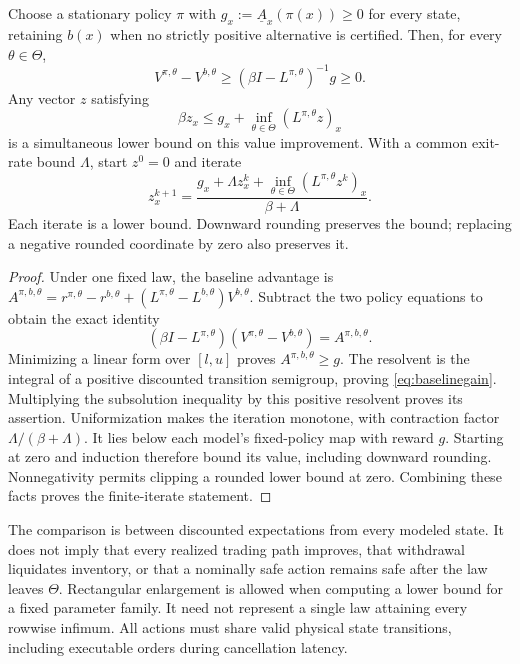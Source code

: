 \begin{theorem}
\label{thm:baselinequoting}
Choose a stationary policy $\pi$ with $g_x:=\underline A_x(\pi(x))\ge0$
for every state, retaining $b(x)$ when no strictly positive alternative is
certified. Then, for every $\theta\in\Theta$,
\begin{equation}\label{eq:baselinegain}
 V^{\pi,\theta}-V^{b,\theta}
 \ge (\beta I-L^{\pi,\theta})^{-1}g\ge0.
\end{equation}
Any vector $z$ satisfying
\begin{equation}\label{eq:baselinegainsubsolution}
 \beta z_x\le g_x+\inf_{\theta\in\Theta}(L^{\pi,\theta}z)_x
\end{equation}
is a simultaneous lower bound on this value improvement.
With a common exit-rate bound $\Lambda$, start $z^0=0$ and iterate
\begin{equation}\label{eq:baselinegainiteration}
 z^{k+1}_x=
 \frac{g_x+\Lambda z^k_x+
          \inf_{\theta\in\Theta}(L^{\pi,\theta}z^k)_x}{\beta+\Lambda}.
\end{equation}
Each iterate is a lower bound. Downward rounding preserves the bound;
replacing a negative rounded coordinate by zero also preserves it.
\end{theorem}
\begin{proof}
Under one fixed law, the baseline advantage is
$A^{\pi,b,\theta}=r^{\pi,\theta}-r^{b,\theta}
 +(L^{\pi,\theta}-L^{b,\theta})V^{b,\theta}$.
Subtract the two policy equations to obtain the exact identity
\[
 (\beta I-L^{\pi,\theta})(V^{\pi,\theta}-V^{b,\theta})
       =A^{\pi,b,\theta}.
\]
Minimizing a linear form over $[l,u]$ proves $A^{\pi,b,\theta}\ge g$.
The resolvent is the integral of a positive discounted transition
semigroup, proving \eqref{eq:baselinegain}. Multiplying the subsolution
inequality by this positive resolvent proves its assertion. Uniformization
makes the iteration monotone, with contraction factor
$\Lambda/(\beta+\Lambda)$. It lies below each model's fixed-policy map
with reward $g$. Starting at zero and induction therefore bound its value,
including downward rounding. Nonnegativity permits clipping a rounded lower
bound at zero. Combining these facts proves the finite-iterate statement.
\end{proof}

\begin{remark}
The comparison is between discounted expectations from every modeled state.
It does not imply that every realized trading path improves, that withdrawal
liquidates inventory, or that a nominally safe action remains safe after the
law leaves $\Theta$. Rectangular enlargement is allowed when computing a
lower bound for a fixed parameter family. It need not represent a single
law attaining every rowwise infimum. All actions must share valid physical
state transitions, including executable orders during cancellation latency.
\end{remark}

